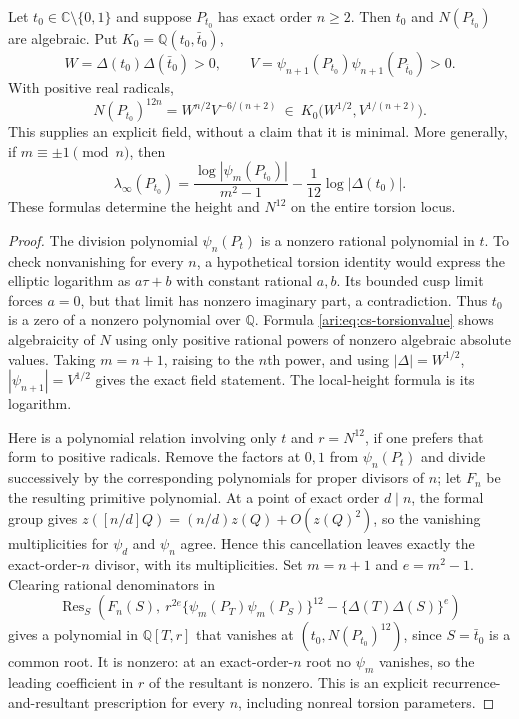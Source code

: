 \begin{proposition}\label{ari:C.4.3}
Let $t_0\in\mathbb C\setminus\{0,1\}$ and suppose $P_{t_0}$ has
exact order $n\ge2$. Then $t_0$ and $N(P_{t_0})$ are algebraic.
Put $K_0=\mathbb Q(t_0,\bar t_0)$,
\[
 W=\Delta(t_0)\Delta(\bar t_0)>0,\qquad
 V=\psi_{n+1}(P_{t_0})\psi_{n+1}(P_{\bar t_0})>0.
\]
With positive real radicals,
\[
 N(P_{t_0})^{12n}=W^{n/2}V^{-6/(n+2)}
 \ \in\ K_0\bigl(W^{1/2},V^{1/(n+2)}\bigr).
\]
This supplies an explicit field, without a claim that it is minimal.
More generally, if $m\equiv\pm1\pmod n$, then
\[
 \lambda_\infty(P_{t_0})
 =\frac{\log|\psi_m(P_{t_0})|}{m^2-1}
       -\frac1{12}\log|\Delta(t_0)|.
\]
These formulas determine the height and $N^{12}$ on the entire
torsion locus.
\end{proposition}

\begin{proof}
The division polynomial $\psi_n(P_t)$ is a nonzero rational
polynomial in $t$. To check nonvanishing for every $n$, a hypothetical
torsion identity would express the elliptic logarithm as
$a\tau+b$ with constant rational $a,b$. Its bounded cusp limit
forces $a=0$, but that limit has nonzero imaginary part, a
contradiction. Thus $t_0$ is a zero of a nonzero polynomial over
$\mathbb Q$. Formula \eqref{ari:eq:cs-torsionvalue} shows algebraicity
of $N$ using only positive rational powers of nonzero algebraic
absolute values. Taking $m=n+1$, raising to the $n$th power, and
using $|\Delta|=W^{1/2}$, $|\psi_{n+1}|=V^{1/2}$ gives the exact
field statement. The local-height formula is its logarithm.

Here is a polynomial relation involving only $t$ and $r=N^{12}$,
if one prefers that form to positive radicals. Remove the factors
at $0,1$ from $\psi_n(P_t)$ and divide successively by the
corresponding polynomials for proper divisors of $n$; let $F_n$ be
the resulting primitive polynomial. At a point of exact order
$d\mid n$, the formal group gives
$z([n/d]Q)=(n/d)z(Q)+O(z(Q)^2)$, so the vanishing multiplicities for
$\psi_d$ and $\psi_n$ agree. Hence this cancellation leaves exactly
the exact-order-$n$ divisor, with its multiplicities. Set
$m=n+1$ and $e=m^2-1$. Clearing rational denominators in
\[
 \operatorname{Res}_S\left(
 F_n(S),\
 r^{2e}\{\psi_m(P_T)\psi_m(P_S)\}^{12}
              -\{\Delta(T)\Delta(S)\}^{e}\right)
\]
gives a polynomial in $\mathbb Q[T,r]$ that vanishes at
$(t_0,N(P_{t_0})^{12})$, since $S=\bar t_0$ is a common root.
It is nonzero: at an exact-order-$n$ root no $\psi_m$ vanishes,
so the leading coefficient in $r$ of the resultant is nonzero.
This is an explicit recurrence-and-resultant prescription for
every $n$, including nonreal torsion parameters.
\end{proof}

